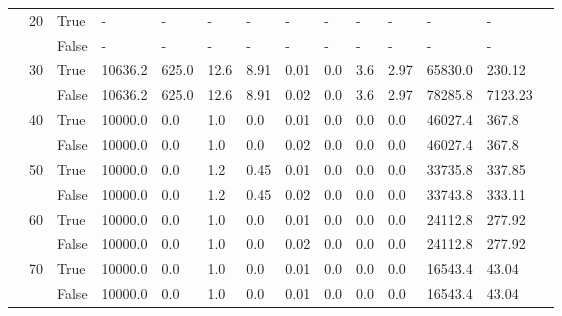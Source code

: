 \begin{landscape}
\begin{small}
\begin{longtable}[c]{@{}lll|ll|ll|ll|ll|lll@{}}
   & 20 & True  & -               & -              & -             & -             & -             & -             & -             & -             & -             & -           &  \\
   &    & False & -               & -              & -             & -             & -             & -             & -             & -             & -             & -           &  \\
   & 30 & True  & 10636.2         & 625.0          & 12.6          & 8.91          & 0.01          & 0.0           & 3.6           & 2.97          & 65830.0       & 230.12      &  \\
   &    & False & 10636.2         & 625.0          & 12.6          & 8.91          & 0.02          & 0.0           & 3.6           & 2.97          & 78285.8       & 7123.23     &  \\
   & 40 & True  & 10000.0         & 0.0            & 1.0           & 0.0           & 0.01          & 0.0           & 0.0           & 0.0           & 46027.4       & 367.8       &  \\
   &    & False & 10000.0         & 0.0            & 1.0           & 0.0           & 0.02          & 0.0           & 0.0           & 0.0           & 46027.4       & 367.8       &  \\
   & 50 & True  & 10000.0         & 0.0            & 1.2           & 0.45          & 0.01          & 0.0           & 0.0           & 0.0           & 33735.8       & 337.85      &  \\
   &    & False & 10000.0         & 0.0            & 1.2           & 0.45          & 0.02          & 0.0           & 0.0           & 0.0           & 33743.8       & 333.11      &  \\
   & 60 & True  & 10000.0         & 0.0            & 1.0           & 0.0           & 0.01          & 0.0           & 0.0           & 0.0           & 24112.8       & 277.92      &  \\
   &    & False & 10000.0         & 0.0            & 1.0           & 0.0           & 0.02          & 0.0           & 0.0           & 0.0           & 24112.8       & 277.92      &  \\
   & 70 & True  & 10000.0         & 0.0            & 1.0           & 0.0           & 0.01          & 0.0           & 0.0           & 0.0           & 16543.4       & 43.04       &  \\
   &    & False & 10000.0         & 0.0            & 1.0           & 0.0           & 0.01          & 0.0           & 0.0           & 0.0           & 16543.4       & 43.04       &  \\

\end{longtable}
\end{small}
\end{landscape}
